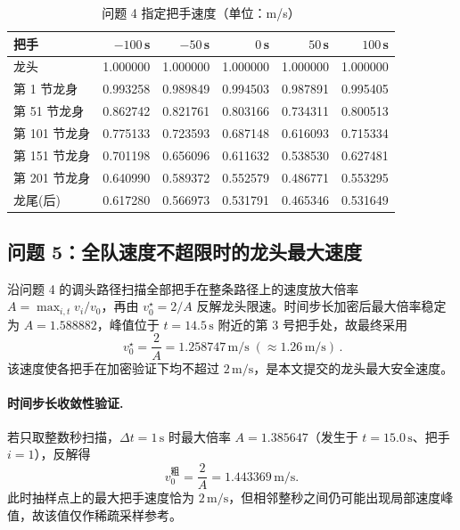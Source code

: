 \documentclass[a4paper, 12pt]{ctexart}
\begin{document}
\begin{table}[H]
  \centering
  \small
  \setlength{\tabcolsep}{7pt}
  \caption{问题 4 指定把手速度（单位：m/s）}
  \label{tab:p4_spd}
  \begin{tabular}{lrrrrr}
    \toprule
    \textbf{把手} & \textbf{$-100\,$s} & \textbf{$-50\,$s} & \textbf{$0\,$s} & \textbf{$50\,$s} & \textbf{$100\,$s} \\
    \midrule
    龙头 & 1.000000 & 1.000000 & 1.000000 & 1.000000 & 1.000000 \\
    第 1 节龙身 & 0.993258 & 0.989849 & 0.994503 & 0.987891 & 0.995405 \\
    第 51 节龙身 & 0.862742 & 0.821761 & 0.803166 & 0.734311 & 0.800513 \\
    第 101 节龙身 & 0.775133 & 0.723593 & 0.687148 & 0.616093 & 0.715334 \\
    第 151 节龙身 & 0.701198 & 0.656096 & 0.611632 & 0.538530 & 0.627481 \\
    第 201 节龙身 & 0.640990 & 0.589372 & 0.552579 & 0.486771 & 0.553295 \\
    龙尾(后) & 0.617280 & 0.566973 & 0.531791 & 0.465346 & 0.531649 \\
    \bottomrule
  \end{tabular}
\end{table}

\subsection{问题 5：全队速度不超限时的龙头最大速度}

沿问题 4 的调头路径扫描全部把手在整条路径上的速度放大倍率 $A=\max_{i,t}v_i/v_0$，再由 $v_0^\star=2/A$ 反解龙头限速。时间步长加密后最大倍率稳定为 $A=1.588882$，峰值位于 $t=14.5\,\mathrm{s}$ 附近的第 $3$ 号把手处，故最终采用
\begin{equation}
\boxed{\,v_0^\star=\frac{2}{A}=1.258747\,\mathrm{m/s}\;(\approx1.26\,\mathrm{m/s})\,}.
\end{equation}
该速度使各把手在加密验证下均不超过 $2\,\mathrm{m/s}$，是本文提交的龙头最大安全速度。

\paragraph{时间步长收敛性验证.} 若只取整数秒扫描，$\Delta t=1\,\mathrm{s}$ 时最大倍率 $A=1.385647$（发生于 $t=15.0\,\mathrm{s}$、把手 $i=1$），反解得
\begin{equation}
v_0^{\text{粗}}=\frac{2}{A}=1.443369\,\mathrm{m/s}.
\end{equation}
此时抽样点上的最大把手速度恰为 $2\,\mathrm{m/s}$，但相邻整秒之间仍可能出现局部速度峰值，故该值仅作稀疏采样参考。
\end{document}

